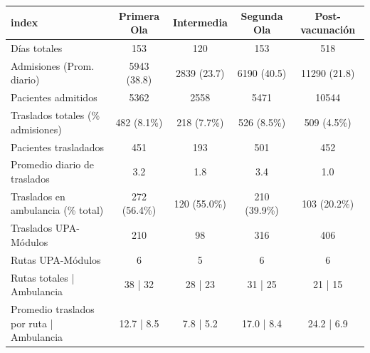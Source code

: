 \begin{tabular}{lcccc}
\toprule
index & Primera Ola & Intermedia & Segunda Ola & Post-vacunación \\
\midrule
Días totales & 153 & 120 & 153 & 518 \\
Admisiones (Prom. diario) & 5943 (38.8) & 2839 (23.7) & 6190 (40.5) & 11290 (21.8) \\
Pacientes admitidos & 5362 & 2558 & 5471 & 10544 \\
Traslados totales (\% admisiones) & 482 (8.1\%) & 218 (7.7\%) & 526 (8.5\%) & 509 (4.5\%) \\
Pacientes trasladados & 451 & 193 & 501 & 452 \\
Promedio diario de traslados & 3.2 & 1.8 & 3.4 & 1.0 \\
Traslados en ambulancia (\% total) & 272 (56.4\%) & 120 (55.0\%) & 210 (39.9\%) & 103 (20.2\%) \\
Traslados UPA-Módulos & 210 & 98 & 316 & 406 \\
Rutas UPA-Módulos & 6 & 5 & 6 & 6 \\
Rutas totales | Ambulancia & 38 | 32 & 28 | 23 & 31 | 25 & 21 | 15 \\
Promedio traslados por ruta | Ambulancia & 12.7 | 8.5 & 7.8 | 5.2 & 17.0 | 8.4 & 24.2 | 6.9 \\
\bottomrule
\end{tabular}
